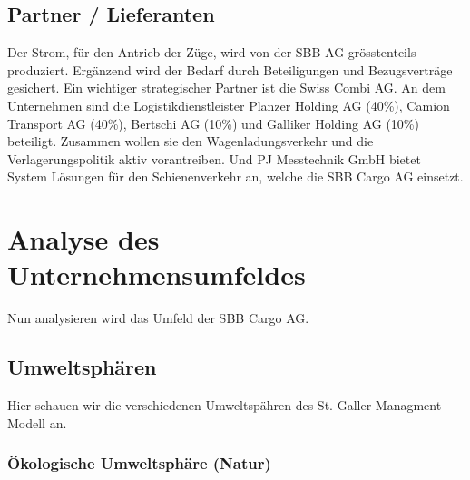 \documentclass{article}
\begin{document}
\subsection{Partner / Lieferanten}
Der Strom, für den Antrieb der Züge, wird von der SBB AG grösstenteils produziert.
Ergänzend wird der Bedarf durch Beteiligungen und Bezugsverträge gesichert.
Ein wichtiger strategischer Partner ist die Swiss Combi AG. 
An dem Unternehmen sind die Logistikdienstleister Planzer Holding AG (40\%), Camion Transport AG (40\%), Bertschi AG (10\%) und Galliker Holding AG (10\%) beteiligt.
Zusammen wollen sie den Wagenladungsverkehr und die Verlagerungspolitik aktiv vorantreiben.
Und PJ Messtechnik GmbH bietet System Lösungen für den Schienenverkehr an, welche die SBB Cargo AG einsetzt. 

\section{Analyse des Unternehmensumfeldes}

Nun analysieren wird das Umfeld der SBB Cargo AG.

\subsection{Umweltsphären}

Hier schauen wir die verschiedenen Umweltspähren des St. Galler Managment-Modell an.

\subsubsection{Ökologische Umweltsphäre (Natur)}
\end{document}
